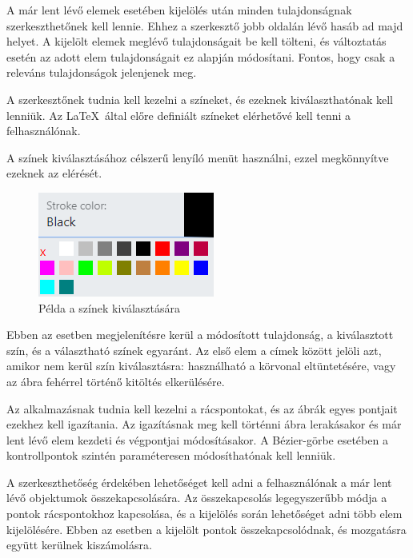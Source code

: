 A már lent lévő elemek esetében kijelölés után minden tulajdonságnak szerkeszthetőnek kell lennie. Ehhez a szerkesztő jobb oldalán lévő hasáb ad majd helyet. A kijelölt elemek meglévő tulajdonságait be kell tölteni, és változtatás esetén az adott elem tulajdonságait ez alapján módosítani. Fontos, hogy csak a releváns tulajdonságok jelenjenek meg.


A szerkesztőnek tudnia kell kezelni a színeket, és ezeknek kiválaszthatónak kell lenniük. Az \LaTeX\ által előre definiált színeket elérhetővé kell tenni a felhasználónak. 

A színek kiválasztásához célszerű lenyíló menüt használni, ezzel megkönnyítve ezeknek az elérését. 

\begin{figure}[!h]
	\centering
	\label{fig:cp}
	\includegraphics[]{images/colorpicker.png}
	\caption{Példa a színek kiválasztására}
\end{figure}

Ebben az esetben megjelenítésre kerül a módosított tulajdonság, a kiválasztott szín, és a választható színek egyaránt. Az első elem a címek között jelöli azt, amikor nem kerül szín kiválasztásra: használható a körvonal eltüntetésére, vagy az ábra fehérrel történő kitöltés elkerülésére.


Az alkalmazásnak tudnia kell kezelni a rácspontokat, és az ábrák egyes pontjait ezekhez kell igazítania. Az igazításnak meg kell történni ábra lerakásakor és már lent lévő elem kezdeti és végpontjai módosításakor. A Bézier-görbe esetében a kontrollpontok szintén paraméteresen módosíthatónak kell lenniük.


A szerkeszthetőség érdekében lehetőséget kell adni a felhasználónak a már lent lévő objektumok összekapcsolására. Az összekapcsolás legegyszerűbb módja a pontok rácspontokhoz kapcsolása, és a kijelölés során lehetőséget adni több elem kijelölésére. Ebben az esetben a kijelölt pontok összekapcsolódnak, és mozgatásra együtt kerülnek kiszámolásra.

